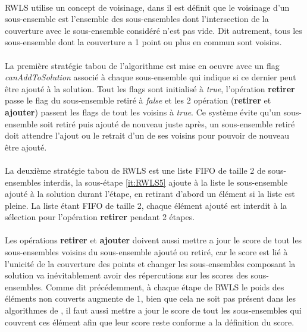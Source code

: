 \documentclass[a4paper,11pt,twoside,french,report]{../common/simplem}
\begin{document}
				\paragraph*{}
					\gls{RWLS} utilise un concept de voisinage, dans \cite{Gao2015} il est définit que le voisinage d'un sous-ensemble est l'ensemble des sous-ensembles dont l'intersection de la couverture avec le sous-ensemble considéré n'est pas vide. Dit autrement, tous les sous-ensemble dont la couverture a 1 point ou plus en commun sont voisins.
				\paragraph*{}
					La première stratégie tabou de l'algorithme est mise en oeuvre avec un flag \textit{canAddToSolution} associé à chaque sous-ensemble qui indique si ce dernier peut être ajouté à la solution. Tout les flags sont initialisé à \textit{true}, l'opération \textbf{retirer} passe le flag du sous-ensemble retiré à \textit{false} et les 2 opération (\textbf{retirer} et \textbf{ajouter}) passent les flags de tout les voisins à \textit{true}. Ce système évite qu'un sous-ensemble soit retiré puis ajouté de nouveau juste après, un sous-ensemble retiré doit attendre l'ajout ou le retrait d'un de ses voisins pour pouvoir de nouveau être ajouté.
				\paragraph*{}
					La deuxième stratégie tabou de \gls{RWLS} est une liste \gls{FIFO} de taille 2 de sous-ensembles interdis, la sous-étape \ref{it:RWLS5} ajoute à la liste le sous-ensemble ajouté à la solution durant l'étape, en retirant d'abord un élément si la liste est pleine. La liste étant \gls{FIFO} de taille 2, chaque élément ajouté est interdit à la sélection pour l'opération \textbf{retirer} pendant 2 étapes.
				\paragraph*{}
					Les opérations \textbf{retirer} et \textbf{ajouter} doivent aussi mettre a jour le score de tout les sous-ensembles voisins du sous-ensemble ajouté ou retiré, car le score est lié à l'unicité de la couverture des points et changer les sous-ensembles composant la solution va inévitablement avoir des répercutions sur les scores des sous-ensembles. Comme dit précédemment, à chaque étape de \gls{RWLS} le poids des éléments non couverts augmente de 1, bien que cela ne soit pas présent dans les algorithmes de \cite{Gao2015}, il faut aussi mettre a jour le score de tout les sous-ensembles qui couvrent ces élément afin que leur score reste conforme a la définition du score.
\end{document}
